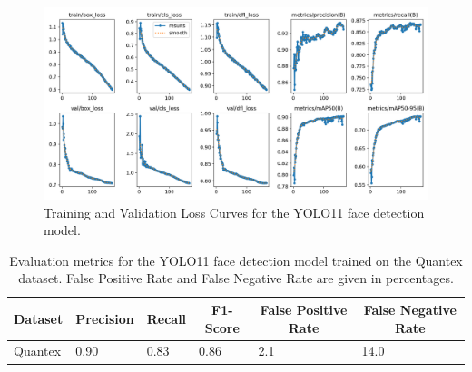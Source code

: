 \documentclass[
  man,floatsintext]{apa6}
\begin{document}
\begin{figure}

{\centering \includegraphics[width=450px]{images/yolo_face_loss_curves} 

}

\caption{Training and Validation Loss Curves for the YOLO11 face detection model.}\label{fig:person-loss-curves}
\end{figure}

\begin{table}[tbp]

\begin{center}
\begin{threeparttable}

\caption{\label{tab:person-detection-metrics-detailed}Evaluation metrics for the YOLO11 face detection model trained on the Quantex dataset. False Positive Rate and False Negative Rate are given in percentages.}

\begin{tabular}{llllll}
\toprule
Dataset & \multicolumn{1}{c}{Precision} & \multicolumn{1}{c}{Recall} & \multicolumn{1}{c}{F1-Score} & \multicolumn{1}{c}{False Positive Rate} & \multicolumn{1}{c}{False Negative Rate}\\
\midrule
Quantex & 0.90 & 0.83 & 0.86 & 2.1 & 14.0\\
\bottomrule
\end{tabular}

\end{threeparttable}
\end{center}

\end{table}
\end{document}
